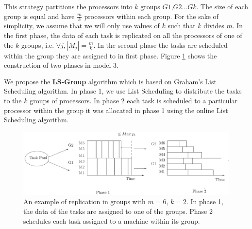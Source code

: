 \documentclass[10pt, conference, compsocconf]{IEEEtran}
\begin{document}
This strategy partitions the processors into $k$ groups
$G1$,$G2$...$Gk$. The size of each group is equal and have
$\frac{m}{k}$ processors within each group. For the sake of
simplicity, we assume that we will only use values of $k$ such that
$k$ divides $m$. In the first phase, the data of each task is
replicated on all the processors of one of the $k$ groups,
i.e. $\forall j, |M_j|= \frac{m}{k}$. In the second phase the tasks
are scheduled within the group they are assigned to in first phase.
Figure \ref{fig:Model 3} shows the construction of two phases in model
3.

We propose the \textbf{LS-Group} algorithm which is based on Graham's
List Scheduling algorithm. In phase 1, we use List Scheduling to
distribute the tasks to the $k$ groups of processors. In phase 2 each
task is scheduled to a particular processor within the group it was
allocated in phase 1 using the online List Scheduling algorithm.

\begin{figure}[htp] 
\centering
\includegraphics[width=\linewidth]{model3.pdf}
\caption{An example of replication in groups with $m = 6$, $k = 2$. In
  phase 1, the data of the tasks are assigned to one of the
  groups. Phase 2 schedules each task assigned to a machine within its
  group.}
\label{fig:Model 3}
\end{figure}
\end{document}
